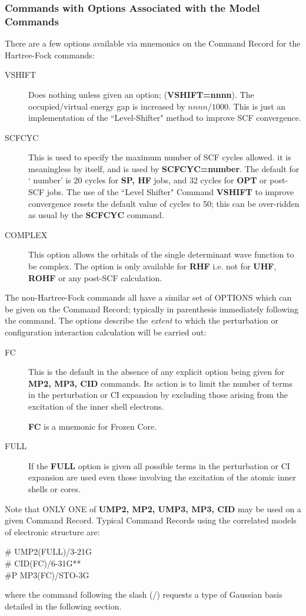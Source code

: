\subsubsection{\sf Commands with Options Associated with the Model Commands}
There are a few options available via mnemonics on the Command
Record for the Hartree-Fock commands:
\begin{description}
\item[VSHIFT] Does nothing unless given an option; ({\bf VSHIFT=nnnn}).
The occupied/virtual energy gap is increased by $nnnn/1000$. This is just
an implementation of the ``Level-Shifter" method to improve SCF
convergence.
\item[SCFCYC]  This is used to specify the maximum number of SCF cycles
allowed. it is meaningless by itself, and is used by
{\bf SCFCYC=number}. The default for ` number' is 
20 cycles for {\bf SP, HF} jobs,
and 32 cycles for {\bf OPT} or post-SCF jobs. The use of the
``Level Shifter" Command {\bf VSHIFT} to improve convergence
resets the default value of cycles to 50; this can be over-ridden
as usual by the {\bf SCFCYC} command.
\item[COMPLEX] This option allows the orbitals of the single
determinant wave function to be complex. The option is only available
for {\bf RHF} i.e. not for {\bf UHF}, {\bf ROHF} or any post-SCF
calculation.
\end{description}
The non-Hartree-Fock commands all have a similar set of
OPTIONS which can be given on the Command Record; typically in
parenthesis immediately following the command. The options
describe the {\em extent} to which the perturbation or configuration 
interaction calculation will be carried out:
\begin{description}
\item[FC]  This is the default in the absence of any
explicit option being given for {\bf MP2, MP3, CID} commands.
Its action is to limit the number of terms in the perturbation or CI
expansion by excluding those arising from
the excitation of the inner shell electrons.

{\bf FC} is a mnemonic for Frozen Core.
\item[FULL] If the {\bf FULL} option is given
all possible terms in the perturbation or CI expansion are used even those
involving the excitation of the atomic inner shells or cores.
\end{description}
Note that ONLY ONE of {\bf UMP2, MP2, UMP3, MP3,
CID} may be used on a given Command Record. Typical Command Records
using the correlated models of electronic structure are:
\begin{description}
\item[\# UMP2(FULL)/3-21G]
\item[\# CID(FC)/6-31G**]
\item[\#P MP3(FC)/STO-3G]
\end{description}
where the command following the slash (/) requests a type of 
Gaussian basis detailed in the following section.
\newpage
